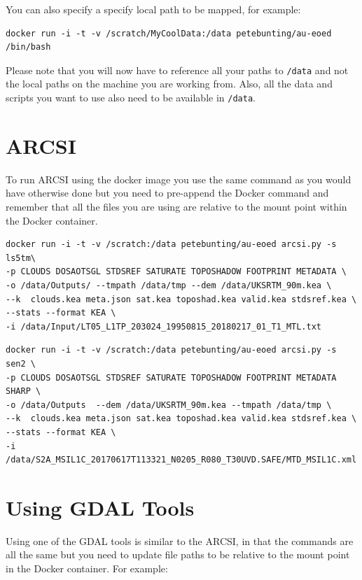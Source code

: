 \documentclass[authoryear, 11pt, oneside]{report}
\begin{document}
You can also specify a specify local path to be mapped, for example:

\begin{verbatim}
docker run -i -t -v /scratch/MyCoolData:/data petebunting/au-eoed /bin/bash
\end{verbatim}

Please note that you will now have to reference all your paths to \texttt{/data} and not the local paths on the machine you are working from. Also, all the data and scripts you want to use also need to be available in \texttt{/data}.

\section{ARCSI}

To run ARCSI using the docker image you use the same command as you would have otherwise done but you need to pre-append the Docker command and remember that all the files you are using are relative to the mount point within the Docker container.

\begin{verbatim}
docker run -i -t -v /scratch:/data petebunting/au-eoed arcsi.py -s ls5tm\
-p CLOUDS DOSAOTSGL STDSREF SATURATE TOPOSHADOW FOOTPRINT METADATA \
-o /data/Outputs/ --tmpath /data/tmp --dem /data/UKSRTM_90m.kea \
--k  clouds.kea meta.json sat.kea toposhad.kea valid.kea stdsref.kea \
--stats --format KEA \
-i /data/Input/LT05_L1TP_203024_19950815_20180217_01_T1_MTL.txt
\end{verbatim}
\newpage
\begin{verbatim}
docker run -i -t -v /scratch:/data petebunting/au-eoed arcsi.py -s sen2 \
-p CLOUDS DOSAOTSGL STDSREF SATURATE TOPOSHADOW FOOTPRINT METADATA SHARP \
-o /data/Outputs  --dem /data/UKSRTM_90m.kea --tmpath /data/tmp \
--k  clouds.kea meta.json sat.kea toposhad.kea valid.kea stdsref.kea \
--stats --format KEA \
-i /data/S2A_MSIL1C_20170617T113321_N0205_R080_T30UVD.SAFE/MTD_MSIL1C.xml
\end{verbatim}

\section{Using GDAL Tools}

Using one of the GDAL tools is similar to the ARCSI, in that the commands are all the same but you need to update file paths to be relative to the mount point in the Docker container. For example:
\end{document}
